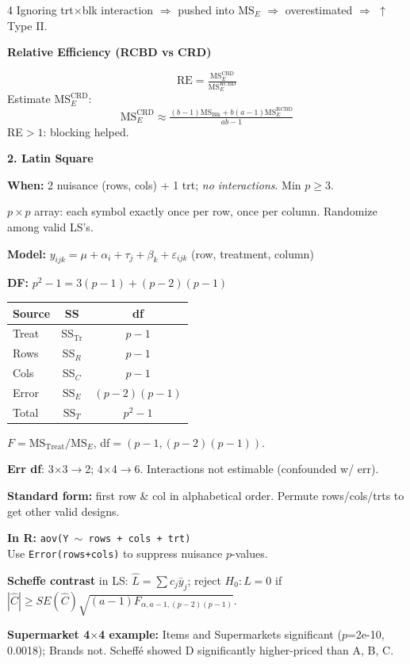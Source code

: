 \documentclass[7pt,letterpaper,landscape]{extarticle}
\newcommand{\secbar}[1]{%
  \vspace{2pt}%
  {\colorbox{black!80}{\parbox{\dimexpr\linewidth-2\fboxsep}{\color{white}\small\bfseries #1}}}\par%
  \vspace{1pt}%
}
\newcommand{\subsec}[1]{\vspace{1pt}\textbf{\small #1}\par}
\newcommand{\MSE}{\mathrm{MS}_E}
\newcommand{\MST}{\mathrm{MS}_{\text{Treat}}}
\newcommand{\SSE}{\mathrm{SS}_E}
\newcommand{\SST}{\mathrm{SS}_T}
\begin{document}
\begin{multicols*}{4}
Ignoring trt$\times$blk interaction $\Rightarrow$ pushed into $\MSE$ $\Rightarrow$ overestimated $\Rightarrow$ $\uparrow$Type II.

\subsec{Relative Efficiency (RCBD vs CRD)}
\[\text{RE}{=}\tfrac{\MSE^{\text{CRD}}}{\MSE^{\text{RCBD}}}\]
Estimate $\MSE^{\text{CRD}}$:
\[\MSE^{\text{CRD}}{\approx}\tfrac{(b{-}1)\mathrm{MS}_{\text{Blk}}{+}b(a{-}1)\MSE^{\text{RCBD}}}{ab{-}1}\]
RE${>}1$: blocking helped.

\secbar{2. Latin Square}
\textbf{When:} 2 nuisance (rows, cols) + 1 trt; \emph{no interactions}. Min $p{\ge}3$.

$p\times p$ array: each symbol exactly once per row, once per column. Randomize among valid LS's.

\textbf{Model:} $y_{ijk}{=}\mu{+}\alpha_i{+}\tau_j{+}\beta_k{+}\varepsilon_{ijk}$ (row, treatment, column)

\textbf{DF:} $p^2{-}1{=}3(p{-}1){+}(p{-}2)(p{-}1)$

{\scriptsize
\begin{tabular}{@{}lcc@{}}
\toprule
Source & SS & df\\
\midrule
Treat & SS$_{\text{Tr}}$ & $p{-}1$\\
Rows & SS$_R$ & $p{-}1$\\
Cols & SS$_C$ & $p{-}1$\\
Error & $\SSE$ & $(p{-}2)(p{-}1)$\\
Total & $\SST$ & $p^2{-}1$\\
\bottomrule
\end{tabular}\par}

$F{=}\MST/\MSE$, df${=}(p{-}1,(p{-}2)(p{-}1))$.

\textbf{Err df}: 3$\times$3$\to$2; 4$\times$4$\to$6. Interactions not estimable (confounded w/ err).

\textbf{Standard form:} first row \& col in alphabetical order. Permute rows/cols/trts to get other valid designs.

\textbf{In R:} \texttt{aov(Y $\sim$ rows + cols + trt)}\\ 
Use \texttt{Error(rows+cols)} to suppress nuisance $p$-values.

\textbf{Scheffe contrast} in LS: $\hat L = \sum c_j \bar y_j$; reject $H_0{:}L{=}0$ if $|\hat C|\ge SE(\hat C)\sqrt{(a{-}1)F_{\alpha,a-1,(p-2)(p-1)}}$.

\textbf{Supermarket 4$\times$4 example:} Items and Supermarkets significant ($p$=2e-10, 0.0018); Brands not. Scheffé showed D significantly higher-priced than A, B, C.


\end{multicols*}
\end{document}
